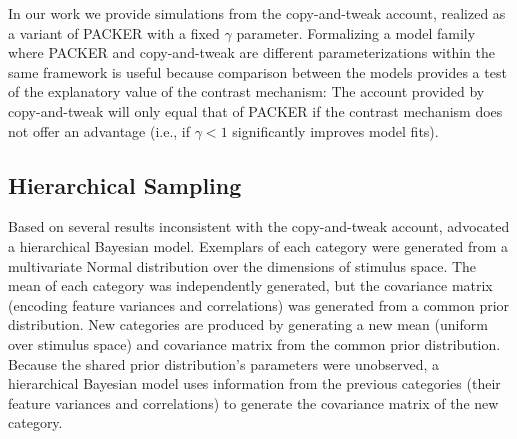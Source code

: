 \documentclass[10pt,letterpaper]{article}
\begin{document}
In our work we provide simulations from the copy-and-tweak account, realized as a variant of PACKER with a fixed $\gamma$ parameter. Formalizing a model family where PACKER and copy-and-tweak are different parameterizations within the same framework is useful because comparison between the models provides a test of the explanatory value of the contrast mechanism: The account provided by copy-and-tweak will only equal that of PACKER if the contrast mechanism does not offer an advantage (i.e., if $\gamma < 1$ significantly improves model fits).



\subsection{Hierarchical Sampling}

Based on several results inconsistent with the copy-and-tweak account, \citet{jern2013probabilistic} advocated a hierarchical Bayesian model. Exemplars of each category were generated from a multivariate Normal distribution over the dimensions of stimulus space. The mean of each category was independently generated, but the covariance matrix (encoding feature variances and correlations) was generated from a common prior distribution. New categories are produced by generating a new mean (uniform over stimulus space) and covariance matrix from the common prior distribution. Because the shared prior distribution's parameters were unobserved, a hierarchical Bayesian model uses information from the previous categories (their feature variances and correlations) to generate the covariance matrix of the new category.
\end{document}
